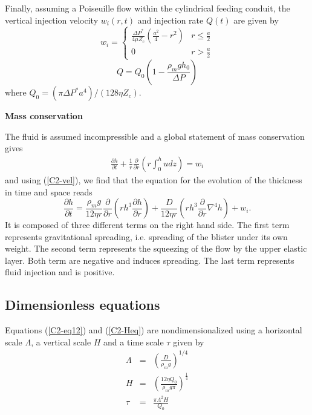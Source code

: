 Finally,  assuming a  Poiseuille flow  within the  cylindrical feeding
conduit, the vertical injection velocity $w_i(r,t)$ and injection rate
$Q(t)$ are given by
\begin{equation}
  w_i=
  \begin{cases}
    \frac{ \Delta P^*}{4 \mu Z_{c}} (\frac{a^{2}}{4}-r^{2})& r \le \frac{a}{2}\\
    0 & r > \frac{a}{2}
  \end{cases}
  \label{C2-eq12}
\end{equation}
\begin{equation}
  Q = Q_0(1-\frac{\rho_m g h_0}{\Delta P})
  \label{C2-eq11}
\end{equation}
where
$Q_0=\left(\pi \Delta P^* a^{4}\right)/\left(128 \eta Z_c\right)$.

\vspace{.5cm} \textbf{Mass conservation} \vspace{.5cm}

The fluid  is assumed  incompressible and a  global statement  of mass
conservation gives
\begin{eqnarray}
  \frac{\partial         h}{\partial        t} +\frac{1}{r}
  \frac{\partial}{\partial
  r} \left( r\int_0^hudz\right) = w_i
  \label{C2-Mass}
\end{eqnarray}
and using (\ref{C2-vel}), we find  that the equation for the evolution
of the thickness in time and space reads
\begin{equation}
  \frac{\partial h}{\partial t} =\frac{\rho_mg}{12 \eta r}
  \frac{\partial}{\partial r}  \left( rh^3  \frac{\partial h}{\partial
      r}\right)+\frac{D}{12\eta r} \left( rh^3 \frac{\partial}{\partial r}\nabla^4h\right)+
  w_i .\label{C2-Heq}
\end{equation}
It is  composed of three different  terms on the right  hand side. The
first term represents gravitational  spreading, i.e.  spreading of the
blister under its own weight. The second term represents the squeezing
of the  flow by the upper  elastic layer.  Both term  are negative and
induces spreading.   The last term  represents fluid injection  and is
positive.

\subsection{Dimensionless equations}
\label{C2-sec:dimens-equat}

Equations  (\ref{C2-eq12}) and  (\ref{C2-Heq}) are  nondimensionalized
using a  horizontal scale $\Lambda$, a  vertical scale $H$ and  a time
scale $\tau$ given by
\begin{eqnarray}
  \Lambda &=& \left(\frac{D}{\rho_m g}\right)^{1/4}\label{L1}\\
  H&=&\left       (\frac{12\eta      Q_{0}}{\rho_{m}g       \pi}\right      )
       ^{\frac{1}{4}} \label{H1}\\
  \tau&=&\frac{\pi \Lambda^{2} H}{Q_{0}}\label{T1}
\end{eqnarray}

